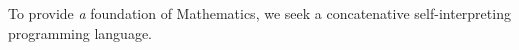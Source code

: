
To provide \emph{a} foundation of Mathematics, we seek a concatenative self-interpreting programming language.